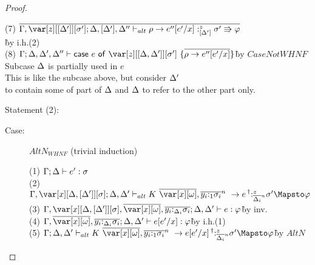 \begin{proof}
\begin{description}
\begin{tabbing}
    (7) $\ov{\G,\z[\irr{\D'}][\s']; \D,[\D'],\D'' \vdash_{alt} \rho \to e''[e'/x] :^z_{\irr{\D'}} \s'\Rrightarrow\vp}$\\\` by i.h.(2)\\
    (8) $\G; \D, \D', \D'' \vdash \ccase{e}{\z[\irr{\D,\D'}][\s']~\{\ov{\rho\to e''[e'/x]}\}}$\`by $CaseNotWHNF$\\
    Subcase $\Delta$ is partially used in $e$\\
    This is like the subcase above, but consider $\Delta'$\\
    to contain some of part of $\Delta$ and $\Delta$ to refer to the other part only.
\end{tabbing}

\end{description}





Statement (2):
\begin{description}
\item[Case:] $AltN_{WHNF}$ (trivial induction)
\begin{tabbing}
  (1) $\Gamma; \Delta \vdash e' : \sigma$\\
  (2) $\G,\xD; \D,\D' \vdash_{alt} \konstructor~\to e \prescript{\dag}{}{:^z_{\ov{\D_i}^n}} \s' \Mapsto \vp$\\
  (3) $\G,\xD,\ov{\xo},\ov{y_i{:}_{\D_i}\s_i}; \D, \D' \vdash e : \vp$\` by inv.\\
  (4) $\G,\ov{\xo},\ov{y_i{:}_{\D_i}\s_i}; \D, \D' \vdash e[e'/x] : \vp$\` by i.h.(1)\\
  (5) $\G; \D,\D' \vdash_{alt} \konstructor~\to e[e'/x] \prescript{\dag}{}{:^z_{\ov{\D_i}^n}} \s' \Mapsto \vp$\` by $AltN$\\
\end{tabbing}


\end{description}
\end{proof}
